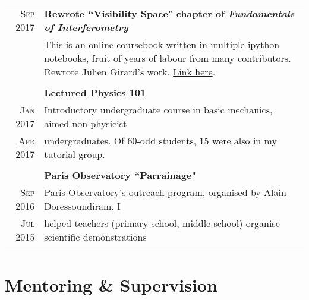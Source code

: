 \documentclass[10pt]{article} %
\begin{document}
\begin{tabular}{r|p{12.5cm}}
	\textsc{Sep 2017} & \textbf{Rewrote ``Visibility Space" chapter of \emph{Fundamentals of Interferometry}}\\
	& This is an online coursebook written in multiple ipython notebooks, fruit of years of labour from many contributors. Rewrote Julien Girard's work. \hyperlink{https://github.com/ratt-ru/fundamentals_of_interferometry}{Link here}.\\                  
	\multicolumn{2}{c}{} \\

	& \textbf{Lectured Physics 101}\vspace{1mm}\\
	\textsc{Jan 2017} & Introductory undergraduate course in basic mechanics, aimed non-physicist\\
	\textsc{Apr 2017} & undergraduates. Of 60-odd students, 15 were also in my tutorial group.\\
	\multicolumn{2}{c}{} \\	

	
	& \textbf{Paris Observatory ``Parrainage"}\vspace{1mm}\\
	\textsc{Sep 2016} & Paris Observatory’s outreach program, organised by Alain Doressoundiram. I\\
	\textsc{Jul 2015} & helped teachers (primary-school, middle-school) organise scientific demonstrations\\
	\multicolumn{2}{c}{} \\	
	
\end{tabular}


\section{Mentoring \& Supervision}
\end{document}
